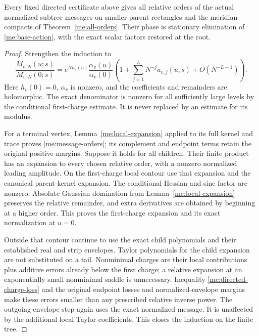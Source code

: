 \begin{proposition}
\label{me:directed-orders}
Every fixed directed certificate above gives all relative orders
of the actual normalized subtree messages on smaller parent
rectangles and the meridian compacts of Theorem~\ref{me:all-orders}.
Their phase is stationary elimination of \eqref{me:base-action},
with the exact scalar factors restored at the root.
\end{proposition}
\begin{proof}
Strengthen the induction to
\begin{equation}\label{me:message-orders}
 \frac{M_{v,N}(u;s)}{M_{v,N}(0;s)}
 =e^{Nh_v(u)}\frac{\alpha_v(u)}{\alpha_v(0)}
 \left(1+\sum_{j=1}^L N^{-j}a_{v,j}(u,s)
                          +O(N^{-L-1})\right).
\end{equation}
Here $h_v(0)=0$, $\alpha_v$ is nonzero, and the coefficients and
remainders are holomorphic. The exact denominator is nonzero
for all sufficiently large levels by the conditional first-charge
estimate. It is never replaced by an estimate for its modulus.

For a terminal vertex, Lemma~\ref{me:local-expansion} applied to
its full kernel and trace proves \eqref{me:message-orders}; its
complement and endpoint terms retain the original positive margins.
Suppose it holds for all children. Their finite product has an
expansion to every chosen relative order, with a nonzero normalized
leading amplitude. On the first-charge local contour use that
expansion and the canonical parent-kernel expansion. The conditional
Hessian and sine factor are nonzero. Absolute Gaussian domination
from Lemma~\ref{me:local-expansion} preserves the relative remainder,
and extra derivatives are obtained by beginning at a higher order.
This proves the first-charge expansion and its exact normalization
at $u=0$.

Outside that contour continue to use the exact child polynomials
and their established real and strip envelopes. Taylor polynomials
for the child expansion are not substituted on a tail. Nonminimal
charges are their local contributions plus additive errors already
below the first charge; a relative expansion at an exponentially
small nonminimal saddle is unnecessary. Inequality
\eqref{me:directed-charge-loss} and the original endpoint losses and
normalized-envelope margins make these errors smaller than any prescribed
relative inverse power. The outgoing-envelope step again uses the
exact normalized message. It is unaffected by the additional local
Taylor coefficients. This closes the induction on the finite tree.


\end{proof}
